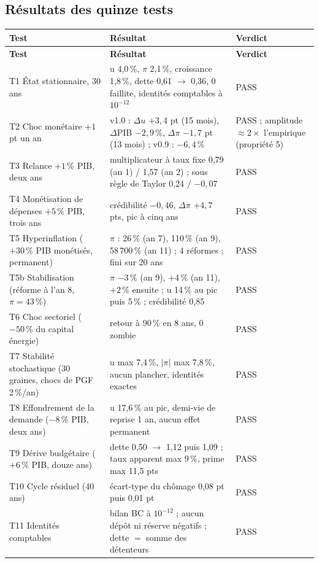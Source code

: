 \documentclass[11pt,a4paper]{article}
\begin{document}
\subsection{Résultats des quinze tests}
\begin{center}\small
\begin{longtable}{p{4.6cm}p{7.6cm}p{1.6cm}}
\toprule
\textbf{Test} & \textbf{Résultat} & \textbf{Verdict}\\
\midrule
\endfirsthead
\toprule
\textbf{Test} & \textbf{Résultat} & \textbf{Verdict}\\
\midrule
\endhead
T1 État stationnaire, 30 ans & u 4,0\,\%, $\pi$ 2,1\,\%, croissance 1,8\,\%, dette 0,61 $\to$ 0,36, 0 faillite, identités comptables à $10^{-12}$ & PASS\\
T2 Choc monétaire $+1$ pt un an & v1.0 : $\Delta u$ $+3{,}4$ pt (15 mois), $\Delta$PIB $-2{,}9\,\%$, $\Delta\pi$ $-1{,}7$ pt (13 mois) ; v0.9 : $-6{,}4\,\%$ & PASS ; amplitude $\approx2\times$ l'empirique (propriété 5)\\
T3 Relance $+1\,\%$ PIB, deux ans & multiplicateur à taux fixe 0,79 (an 1) / 1,57 (an 2) ; sous règle de Taylor 0,24 / $-0{,}07$ & PASS\\
T4 Monétisation de dépenses $+5\,\%$ PIB, trois ans & crédibilité $-0{,}46$, $\Delta\pi$ $+4{,}7$ pts, pic à cinq ans & PASS\\
T5 Hyperinflation ($+30\,\%$ PIB monétisés, permanent) & $\pi$ : 26\,\% (an 7), 110\,\% (an 9), 58\,700\,\% (an 11) ; 4 réformes ; fini sur 20 ans & PASS\\
T5b Stabilisation (réforme à l'an 8, $\pi=43\,\%$) & $\pi$ $-3\,\%$ (an 9), $+4\,\%$ (an 11), $+2\,\%$ ensuite ; u 14\,\% au pic puis 5\,\% ; crédibilité 0,85 & PASS\\
T6 Choc sectoriel ($-50\,\%$ du capital énergie) & retour à 90\,\% en 8 ans, 0 zombie & PASS\\
T7 Stabilité stochastique (30 graines, chocs de PGF 2\,\%/an) & u max 7,4\,\%, $|\pi|$ max 7,8\,\%, aucun plancher, identités exactes & PASS\\
T8 Effondrement de la demande ($-8\,\%$ PIB, deux ans) & u 17,6\,\% au pic, demi-vie de reprise 1 an, aucun effet permanent & PASS\\
T9 Dérive budgétaire ($+6\,\%$ PIB, douze ans) & dette 0,50 $\to$ 1,12 puis 1,09 ; taux apparent max 9\,\%, prime max 11,5 pts & PASS\\
T10 Cycle résiduel (40 ans) & écart-type du chômage 0,08 pt puis 0,01 pt & PASS\\
T11 Identités comptables & bilan BC à $10^{-12}$ ; aucun dépôt ni réserve négatifs ; dette $=$ somme des détenteurs & PASS\\

\end{longtable}
\end{center}
\end{document}
